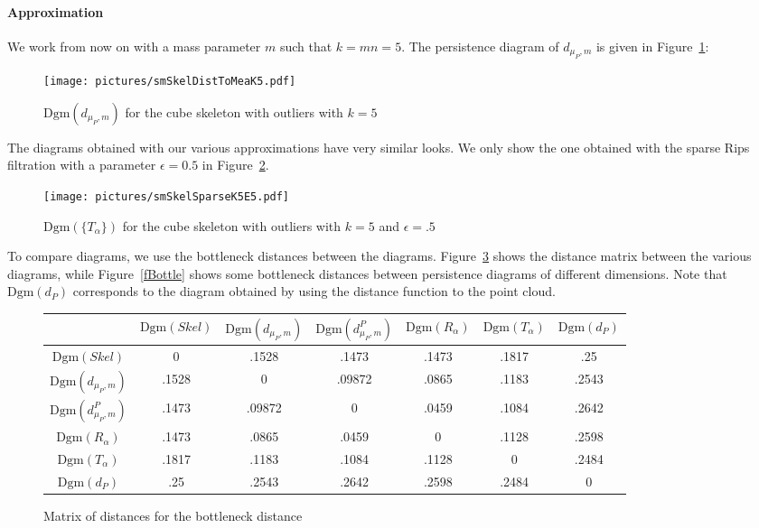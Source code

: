 \documentclass[a4paper]{article}
\newcommand\dmP{d_{\mu_P,m}}
\newcommand\dPP{d_{\mu_P,m}^P}
\newcommand\Dgm[1]{\mathrm{Dgm}(#1)}
\begin{document}
\paragraph{Approximation}

We work from now on with a mass parameter $m$ such that $k=mn=5$. 
The persistence diagram of $\dmP$ is given in Figure~\ref{fPersDmP}:

\begin{figure}[!ht]
\centering
\texttt{[image: pictures/smSkelDistToMeaK5.pdf]}
\caption{$\Dgm{\dmP}$ for the cube skeleton with outliers with $k=5$}\label{fPersDmP}
\end{figure}

The diagrams obtained with our various approximations have very similar looks.
We only show the one obtained with the sparse Rips filtration with a parameter $\epsilon=0.5$ in Figure~\ref{fPersSpars}.

\begin{figure}[!ht]
\centering
\texttt{[image: pictures/smSkelSparseK5E5.pdf]}
\caption{$\Dgm{\{T_\alpha\}}$ for the cube skeleton with outliers with $k=5$ and $\epsilon=.5$}\label{fPersSpars}
\end{figure}

To compare diagrams, we use the bottleneck distances between the diagrams.
Figure~\ref{fMatrix} shows the distance matrix between the various diagrams, while Figure~\ref{fBottle} shows some bottleneck distances between persistence diagrams of different dimensions.
Note that $\Dgm{d_P}$ corresponds to the diagram obtained by using the distance function to the point cloud.

\begin{figure}[!ht]
\centering
\begin{tabular}{|c|cccccc|}
\hline
& $\Dgm{Skel}$ & $\Dgm{\dmP}$ & $\Dgm{\dPP}$ & $\Dgm{R_\alpha}$ & $\Dgm{T_\alpha}$ & $\Dgm{d_P}$ \\
\hline
$\Dgm{Skel}$ & 0 & .1528 & .1473 & .1473 & .1817 & .25 \\
$\Dgm{\dmP}$ & .1528 & 0 & .09872 & .0865 & .1183 & .2543 \\
$\Dgm{\dPP}$ & .1473 & .09872 & 0 & .0459 & .1084 & .2642 \\ 
$\Dgm{R_\alpha}$ & .1473 & .0865 & .0459 & 0 & .1128 & .2598 \\
$\Dgm{T_\alpha}$ & .1817 & .1183 & .1084 & .1128 & 0 & .2484 \\
$\Dgm{d_P}$ & .25 & .2543 & .2642 & .2598 & .2484 & 0 \\
\hline
\end{tabular}
\caption{Matrix of distances for the bottleneck distance}\label{fMatrix}
\end{figure}
\end{document}
